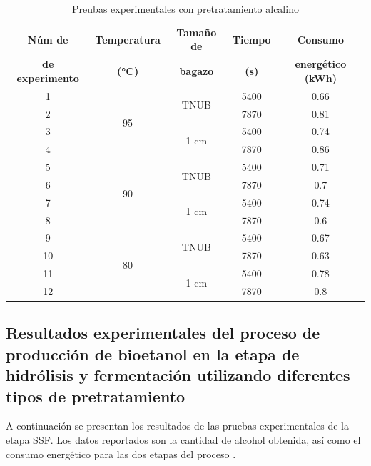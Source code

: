 \documentclass[12pt]{article}
\begin{document}
		
		\begin{table}[H]
			\centering
			\caption{Preubas experimentales con pretratamiento alcalino}
			\begin{tabular}{|c|c|c|c|c|}
				\hline
				\textbf{Núm de} & \textbf{Temperatura} & \textbf{Tamaño de } & \textbf{Tiempo} & \textbf{Consumo } \\ 
			\textbf{de experimento}	&\textbf{ (°C)}&\textbf{ bagazo}  &\textbf{(s)}	&\textbf{ energético (kWh)}\\ \hline
				1 & \multirow{4}{*}{95} & \multirow{2}{*}{TNUB} & 5400 & 0.66  \\ \cline{1-1} \cline{4-5}
				2 &  &  & 7870 & 0.81  \\ \cline{3-5}  \cline{1-1} 
				3 &  & \multirow{2}{*}{1 cm} & 5400 & 0.74 \\  \cline{1-1} \cline{4-5}
				4 &  &  & 7870 & 0.86 \\ \cline{1-1}  \hline
				5 & \multirow{4}{*}{90}& \multirow{2}{*}{TNUB} & 5400 & 0.71  \\ \cline{1-1}  \cline{4-5}
				6 &  &  & 7870 & 0.7  \\ \cline{1-1} \cline{3-5}
				7 &  & \multirow{2}{*}{1 cm} & 5400 & 0.74 \\ \cline{1-1}\cline{4-5}
				8 &  &  & 7870 & 0.6 \\ \hline
				9 & \multirow{4}{*}{80} & \multirow{2}{*}{TNUB} & 5400 & 0.67  \\ \cline{1-1}\cline{4-5}
				10 &  &  & 7870 & 0.63  \\ \cline{1-1} \cline{3-5}
				11 &  &\multirow{2}{*}{1 cm} & 5400 & 0.78 \\ \cline{1-1}\cline{4-5}
				12 &  &  & 7870 & 0.8 \\ \hline
			\end{tabular}
			\label{Pretratamiento Alcalino}
		\end{table}
		
		
		
		
	
	\subsection{Resultados experimentales del proceso de producción de bioetanol en la etapa de hidrólisis y fermentación utilizando diferentes tipos de pretratamiento}
A continuación se presentan los resultados de las pruebas experimentales de la etapa SSF. Los datos reportados son la cantidad de alcohol obtenida, así como el consumo energético para las dos etapas del proceso .
\end{document}

